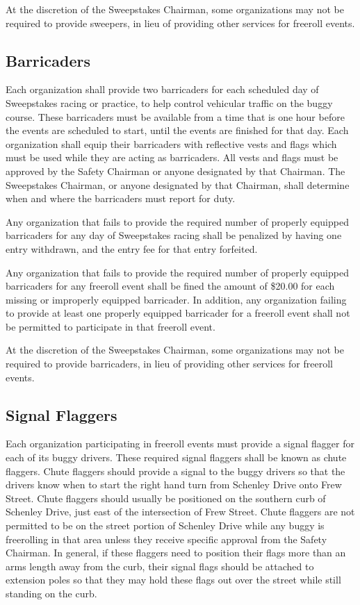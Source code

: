 	At the discretion of the Sweepstakes Chairman, some organizations may not be
	required to provide sweepers, in lieu of providing other services for freeroll
	events.
	
\subsection{Barricaders}

	Each organization shall provide two barricaders for each scheduled day of
	Sweepstakes racing or practice, to help control vehicular traffic on the buggy course.
	These barricaders must be available from a time that is one hour before the events
	are scheduled to start, until the events are finished for that day. Each
	organization shall equip their barricaders with reflective vests and flags which
	must be used while they are acting as barricaders. All vests and flags must be
	approved by the Safety Chairman or anyone designated by that Chairman. The
	Sweepstakes Chairman, or anyone designated by that Chairman, shall determine
	when and where the barricaders must report for duty.

	Any organization that fails to provide the required number of properly equipped
	barricaders for any day of Sweepstakes racing shall be penalized by having one
	entry withdrawn, and the entry fee for that entry forfeited.

	Any organization that fails to provide the required number of properly equipped
	barricaders for any freeroll event shall be fined the amount of \$20.00 for
	each missing or improperly equipped barricader. In addition, any organization
	failing to provide at least one properly equipped barricader for a freeroll
	event shall not be permitted to participate in that freeroll event.

	At the discretion of the Sweepstakes Chairman, some organizations may not be
	required to provide barricaders, in lieu of providing other services for freeroll
	events.
	
	
\subsection{Signal Flaggers}

	Each organization participating in freeroll events must provide a signal
	flagger for each of its buggy drivers. These required signal flaggers shall be
	known as chute flaggers. Chute flaggers should provide a signal to the buggy
	drivers so that the drivers know when to start the right hand turn from
	Schenley Drive onto Frew Street. Chute flaggers should usually be positioned on
	the southern curb of Schenley Drive, just east of the intersection of Frew
	Street. Chute flaggers are not permitted to be on the street portion of
	Schenley Drive while any buggy is freerolling in that area unless they receive
	specific approval from the Safety Chairman. In general, if these flaggers need
	to position their flags more than an arms length away from the curb, their
	signal flags should be attached to extension poles so that they may hold these
	flags out over the street while still standing on the curb.

